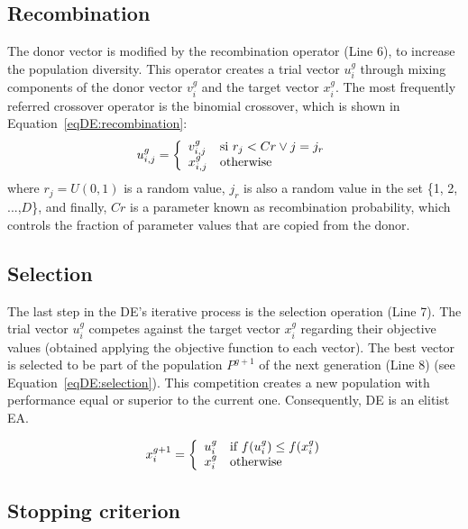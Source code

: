 \subsection{Recombination}
The donor vector is modified by the recombination operator (Line 6), to increase the population diversity. This operator creates a trial vector $u_i^g$ through mixing components of the donor vector $v_i^g$ and the target vector $x_i^g$. The most frequently referred crossover operator is the binomial crossover, which is shown in Equation~\ref{eqDE:recombination}:
\begin{equation} \label{eqDE:recombination}
u_{i,j}^g = \left\lbrace
\begin{array}{ll}
v_{i,j}^g & \textup{si } r_j < Cr \vee j = j_r\\
x_{i,j}^g & \textup{otherwise} 
\end{array}
\right.
\end{equation}
\noindent where $r_j=U(0, 1)$ is a random value, $j_r$ is also a random value in the set \{1, 2, ...,$D$\}, and finally, $Cr$ is a parameter known as recombination probability, which controls the fraction of parameter values that are copied from the donor.

\subsection{Selection}
The last step in the DE's iterative process 
is the selection operation (Line 7). The trial vector $u_{i}^g$ competes against the target vector $x_{i}^g$ regarding their objective values (obtained applying the objective function to each vector). The best vector is selected to be part of the population $P^{g+1}$ of the next generation (Line 8) (see Equation~\ref{eqDE:selection}). This competition creates a new population with performance equal or superior to the current one. Consequently, DE is an elitist EA. 

\begin{equation} ~\label{eqDE:selection}
x_{i}^{g+1} = \left\lbrace
\begin{array}{ll}
u_{i}^g & \textup{if } f(u_{i}^g) \leq f(x_{i}^g)\\
x_{i}^g & \textup{otherwise} 
\end{array}
\right.
\end{equation}

\subsection{Stopping criterion}

